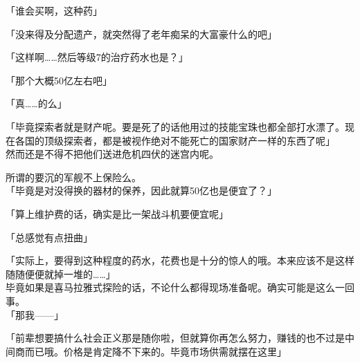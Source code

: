 「谁会买啊，这种药」

「没来得及分配遗产，就突然得了老年痴呆的大富豪什么的吧」

「这样啊……然后等级7的治疗药水也是？」

「那个大概50亿左右吧」

「真……的么」

「毕竟探索者就是财产呢。要是死了的话他用过的技能宝珠也都全部打水漂了。现在各国的顶级探索者，都是被视作绝对不能死亡的国家财产一样的东西了呢」\\

然而还是不得不把他们送进危机四伏的迷宫内呢。

所谓的要沉的军舰不上保险么。\\

「毕竟是对没得换的器材的保养，因此就算50亿也是便宜了？」

「算上维护费的话，确实是比一架战斗机要便宜呢」

「总感觉有点扭曲」

「实际上，要得到这种程度的药水，花费也是十分的惊人的哦。本来应该不是这样随随便便就掉一堆的……」\\

毕竟如果是喜马拉雅式探险的话，不论什么都得现场准备呢。确实可能是这么一回事。\\

「那我——」

「前辈想要搞什么社会正义那是随你啦，但就算你再怎么努力，赚钱的也不过是中间商而已哦。价格是肯定降不下来的。毕竟市场供需就摆在这里」

